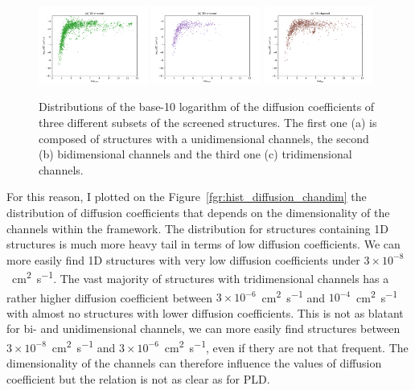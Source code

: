 \documentclass[main]{subfiles}
\begin{document}
\begin{figure}[ht]
  \centering
    \includegraphics[width=0.32\textwidth]{figures/5-diffusion/D_log-PLD_1D_chan.pdf}
    \includegraphics[width=0.32\textwidth]{figures/5-diffusion/D_log-PLD_2D_chan.pdf}
    \includegraphics[width=0.32\textwidth]{figures/5-diffusion/D_log-PLD_3D_chan.pdf}
    \caption{ Distributions of the base-10 logarithm of the diffusion coefficients of three different subsets of the screened structures. The first one (a) is composed of structures with a unidimensional channels, the second (b) bidimensional channels and the third one (c) tridimensional channels. }\label{fgr:scatter_diffusion_chandim}
\end{figure}

For this reason, I plotted on the Figure~\ref{fgr:hist_diffusion_chandim} the distribution of diffusion coefficients that depends on the dimensionality of the channels within the framework. The distribution for structures containing 1D structures is much more heavy tail in terms of low diffusion coefficients. We can more easily find 1D structures with very low diffusion coefficients under $3\times 10^{-8}$~\si{\square\cm\per\s}. The vast majority of structures with tridimensional channels has a rather higher diffusion coefficient between $3\times 10^{-6}$~\si{\square\cm\per\s} and $10^{-4}$~\si{\square\cm\per\s} with almost no structures with lower diffusion coefficients. This is not as blatant for bi- and unidimensional channels, we can more easily find structures between $3\times 10^{-8}$~\si{\square\cm\per\s} and $3\times 10^{-6}$~\si{\square\cm\per\s}, even if thery are not that frequent. The dimensionality of the channels can therefore influence the values of diffusion coefficient but the relation is not as clear as for PLD.
\end{document}
